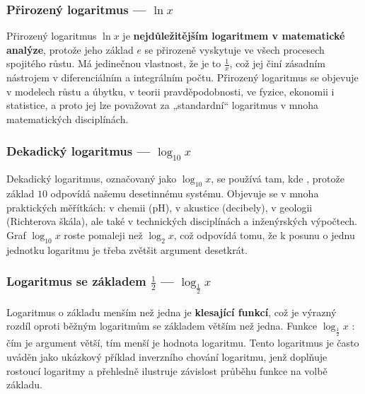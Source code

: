 \documentclass[12pt,a4paper]{article}
\begin{document}
\subsubsection*{Přirozený logaritmus — $\ln x$}
Přirozený logaritmus $\ln x$ je \textbf{nejdůležitějším logaritmem v matematické analýze}, 
protože jeho základ $e$ se přirozeně vyskytuje ve všech procesech spojitého růstu. 
Má jedinečnou vlastnost, že je to  
$\frac{1}{x}$, což jej činí zásadním nástrojem v diferenciálním a integrálním počtu. 
Přirozený logaritmus se objevuje v modelech růstu a úbytku, v teorii pravděpodobnosti, 
ve fyzice, ekonomii i statistice, a proto jej lze považovat 
za „standardní“ logaritmus v mnoha matematických disciplínách.

\subsubsection*{Dekadický logaritmus — $\log_{10} x$}
Dekadický logaritmus, označovaný jako $\log_{10} x$, se používá tam, 
kde , protože základ $10$ odpovídá 
našemu desetinnému systému. 
Objevuje se v mnoha praktických měřítkách: v chemii (pH), v akustice (decibely), 
v geologii (Richterova škála), ale také v technických disciplínách a inženýrských výpočtech. 
Graf $\log_{10} x$ roste pomaleji než $\log_2 x$, 
což odpovídá tomu, že k posunu o jednu jednotku logaritmu je třeba zvětšit argument desetkrát.

\subsubsection*{Logaritmus se základem $\tfrac12$ — $\log_{\frac12} x$}
Logaritmus o základu menším než jedna je \textbf{klesající funkcí}, 
což je výrazný rozdíl oproti běžným logaritmům se základem větším než jedna. 
Funkce $\log_{\frac12} x$ : 
čím je argument větší, tím menší je hodnota logaritmu. 
Tento logaritmus je často uváděn jako ukázkový příklad inverzního chování logaritmu, 
jenž doplňuje rostoucí logaritmy a přehledně ilustruje závislost průběhu funkce na volbě základu.
\end{document}
